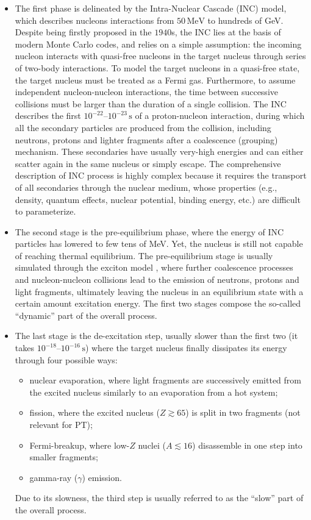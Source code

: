 \begin{itemize}
	\item The first phase is delineated by the Intra-Nuclear Cascade (INC) model, which describes nucleons interactions from $50\,\mathrm{MeV}$ to hundreds of GeV. Despite being firstly proposed in the $1940$s, the INC lies at the basis of modern Monte Carlo codes, and relies on a simple assumption: the incoming nucleon interacts with quasi-free nucleons in the target nucleus through series of two-body interactions. To model the target nucleons in a quasi-free state, the target nucleus must be treated as a Fermi gas. Furthermore, to assume independent nucleon-nucleon interactions, the time between successive collisions must be larger than the duration of a single collision. The INC describes the first $10^{-22}$--$10^{-23}\,\mathrm{s}$ of a proton-nucleon interaction, during which all the secondary particles are produced from the collision, including neutrons, protons and lighter fragments after a coalescence (grouping) mechanism. These secondaries have usually very-high energies and can either scatter again in the same nucleus or simply escape. The comprehensive description of INC process is highly complex because it requires the transport of all secondaries through the nuclear medium, whose properties (e.g., density, quantum effects, nuclear potential, binding energy, etc.) are difficult to parameterize.
	\item The second stage is the pre-equilibrium phase, where the energy of INC particles has lowered to few tens of MeV. Yet, the nucleus is still not capable of reaching thermal equilibrium. The pre-equilibrium stage is usually simulated through the exciton model \cite{PhysRevC.28.1648,PhysRevLett.17.478}, where further coalescence processes and nucleon-nucleon collisions lead to the emission of neutrons, protons and light fragments, ultimately leaving the nucleus in an equilibrium state with a certain amount excitation energy. The first two stages compose the so-called ``dynamic'' part of the overall process.
	\item The last stage is the de-excitation step, usually slower than the first two (it takes $10^{-18}$--$10^{-16}\,\mathrm{s}$) where the target nucleus finally dissipates its energy through four possible ways:
	\begin{itemize}
		\item nuclear evaporation, where light fragments are successively emitted from the excited nucleus similarly to an evaporation from a hot system;
		\item fission, where the excited nucleus ($Z\gtrsim65$) is split in two fragments (not relevant for PT);
		\item Fermi-breakup, where low-$Z$ nuclei ($A\lesssim16$) disassemble in one step into smaller fragments;
		\item gamma-ray ($\gamma$) emission.
	\end{itemize}
	Due to its slowness, the third step is usually referred to as the ``slow'' part of the overall process.
\end{itemize}
